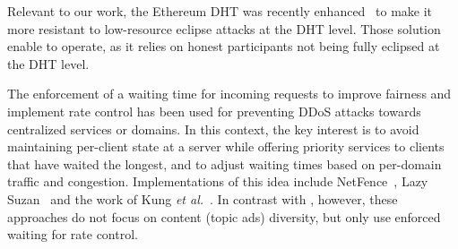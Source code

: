 Relevant to our work, the Ethereum DHT was recently enhanced~\cite{marcus2018low, henningsen2019eclipsing} to make it more resistant to low-resource eclipse attacks at the DHT level. Those solution enable \sysname to operate, as it relies on honest participants not being fully eclipsed at the DHT level.

The enforcement of a waiting time for incoming requests to improve fairness and implement rate control has been used for preventing DDoS attacks towards centralized services or domains.
In this context, the key interest is to avoid maintaining per-client state at a server while offering priority services to clients that have waited the longest, and to adjust waiting times based on per-domain traffic and congestion.
Implementations of this idea include NetFence~\cite{liu2010netfence}, Lazy Suzan~\cite{crowcroft2007lazy} and the work of Kung \emph{et al.}~\cite{kung2015practical}.
In contrast with \sysname, however, these approaches do not focus on content (topic ads) diversity, but only use enforced waiting for rate control.




